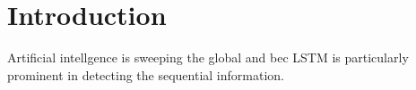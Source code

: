 \section{Introduction}
Artificial intellgence is sweeping the global and bec
LSTM is particularly prominent in detecting the sequential information. 